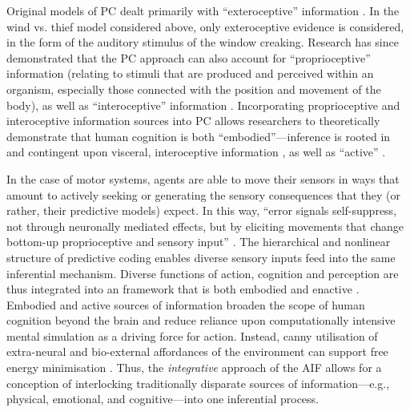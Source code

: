 \begin{CJK}{UTF8}{gbsn}
Original models of PC dealt primarily with ``exteroceptive'' information \citep[relating to stimuli that are external to an organism, i.e. visual, auditory, haptic perception][]{Rao1999,Friston2010}.  In the wind vs. thief model considered above, only exteroceptive evidence is considered, in the form of the auditory stimulus of the window creaking.  Research has since demonstrated that the PC approach can also account for ``proprioceptive'' information (relating to stimuli that are produced and perceived within an organism, especially those connected with the position and movement of the body), as well as ``interoceptive'' information  \citep[relating to stimuli produced within an organism, particularly by the body's organs (viscera) e.g., ``gut feelings,'' or elevated heart rate; see][]{Seth2013,FeldmanBarrett2015}.  Incorporating proprioceptive and interoceptive information sources into PC allows researchers to theoretically demonstrate that human cognition is both ``embodied''---inference is rooted in and contingent upon visceral, interoceptive information \citep[][]{Pezzulo2014}, as well as ``active'' \citep[in the sense that humans can move throughout the environment to reduce the discrepancy between proprioceptive predictions and actual body states, see][]{Friston2010,Clark2015}.

In the case of motor systems, agents are able to move their sensors in ways that amount to actively seeking or generating the sensory consequences that they (or rather, their predictive models) expect.  In this way, ``error signals self-suppress, not through neuronally mediated effects, but by eliciting movements that change bottom-up proprioceptive and sensory input'' \citep[][1349]{Friston2003}.  The hierarchical and nonlinear structure of predictive coding enables diverse sensory inputs feed into the same inferential mechanism.  Diverse functions of action, cognition and perception are thus integrated into an framework that is both embodied and enactive \citep{Friston2015}.  Embodied and active sources of information broaden the scope of human cognition beyond the brain and reduce reliance upon computationally intensive mental simulation as a driving force for action.  Instead, canny utilisation of extra-neural and bio-external affordances of the environment can support free energy minimisation \citep{Clark2015}.  Thus, the \textit{integrative} approach of the AIF allows for a conception of interlocking traditionally disparate sources of information---e.g., physical, emotional, and cognitive---into one inferential process.


\end{CJK}
